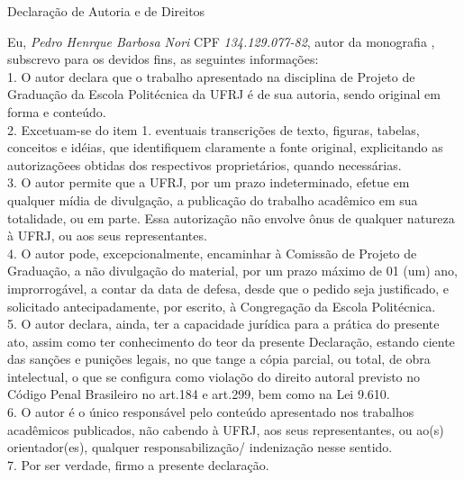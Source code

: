 \begin{center}
Declaração de Autoria e de Direitos
\end{center}

\vspace{0.5cm}

Eu, \emph{Pedro Henrque Barbosa Nori} CPF \emph{134.129.077-82}, autor da monografia \emph{\titulo{}}, subscrevo para os devidos fins, as seguintes informações:\\
1. O autor declara que o trabalho apresentado na disciplina de Projeto de Graduação da Escola Politécnica da UFRJ é de sua autoria, sendo original em forma e conteúdo.\\
2. Excetuam-se do item 1. eventuais transcrições de texto, figuras, tabelas, conceitos e idéias, que identifiquem claramente a fonte original, explicitando as autorizaçõees obtidas dos respectivos proprietários, quando necessárias.\\
3. O autor permite que a UFRJ, por um prazo indeterminado, efetue em qualquer mídia de divulgação, a publicação do trabalho acadêmico em sua totalidade, ou em parte. Essa autorização não envolve ônus de qualquer natureza à UFRJ, ou aos seus representantes.\\
4. O autor pode, excepcionalmente, encaminhar à Comissão de Projeto de Graduação, a não divulgação do material, por um prazo máximo de 01 (um) ano, improrrogável, a contar da data de defesa, desde que o pedido seja justificado, e solicitado antecipadamente, por escrito, à Congregação da Escola Politécnica.\\
5. O autor declara, ainda, ter a capacidade jurídica para a prática do presente ato, assim como ter conhecimento do teor da presente Declaração, estando ciente das sanções e punições legais, no que tange a cópia parcial, ou total, de obra intelectual, o que se configura como violaçõo do direito autoral previsto no Código Penal Brasileiro no art.184 e art.299, bem como na Lei 9.610.\\
6. O autor é o único responsável pelo conteúdo apresentado nos trabalhos acadêmicos publicados, não cabendo à UFRJ, aos seus representantes,  ou ao(s) orientador(es), qualquer responsabilização/ indenização nesse sentido.\\
7. Por ser verdade, firmo a presente declaração.\\

      \vspace{0.5cm}
      \begin{flushright}
         \parbox{10cm}{
            \hrulefill

            \vspace{-.375cm}

            \vspace{0.1cm}
         }
      \end{flushright}

